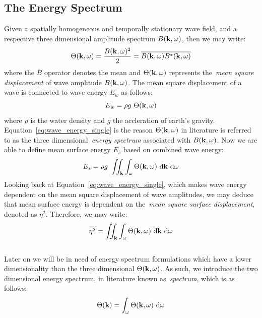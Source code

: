 \subsection{The Energy Spectrum}
\label{sec:energy_spectrum}
Given a spatially homogeneous and temporally stationary wave field, and a
respective three dimensional amplitude spectrum $B(\mathbf{k},\omega)$, then we
may write:
\begin{equation}
\label{eq:energy_spectrum_3d}
 \Theta(\mathbf{k}, \omega) = \frac{B(\mathbf{k}, \omega)^2}{2} = 
\overline{B(\mathbf{k}, \omega)B^{*}(\mathbf{k}, \omega)}
\end{equation}
where the $\overline{B}$ operator denotes the mean and
$\Theta(\mathbf{k},\omega)$ represents the~\emph{mean square displacement} of
wave amplitude $B(\mathbf{k},\omega)$. The mean square displacement of a wave
is connected to wave energy $E_w$ as follows:
%
\begin{equation}
\label{eq:wave_energy_single}
 E_w = \rho g~\Theta(\mathbf{k},\omega)
\end{equation}
%
where $\rho$ is the water density and $g$ the accleration of earth's gravity.
Equation~\ref{eq:wave_energy_single} is the reason $\Theta(\mathbf{k},\omega)$
in literature is referred to as the three dimensional~\emph{energy spectrum}
associated with $B(\mathbf{k},\omega)$. Now we are able to define mean surface
energy $E_s$ based on combined wave energy:
%
\begin{equation}
\label{eq:wave_energy_3d}
 E_s = \rho g~\iint_{\mathbf{k}}\int_{\omega}\Theta(\mathbf{k},\omega)
~\mathrm{d}\mathbf{k}~\mathrm{ d}\omega
\end{equation}
%
Looking back at Equation~\ref{eq:wave_energy_single}, which makes wave energy
dependent on the mean square displacement of wave amplitudes, we may deduce that
mean surface energy is dependent on the~\emph{mean square surface displacement},
denoted as $\overline{\eta^2}$. Therefore, we may write:
%
\begin{equation}
\label{eq:mean_square_eta}
\overline{\eta^2} = \iint_{\mathbf{k}}\int_{\omega}\Theta(\mathbf{k},\omega)
~\mathrm{d}\mathbf{k}~\mathrm{d}\omega
\end{equation}
%
\\
Later on we will be in need of energy spectrum formulations which have a lower
dimensionality than the three dimensional $\Theta(\mathbf{k},\omega)$. As such,
we introduce the two dimensional energy spectrum, in literature known
as~\emph{\wavenumber spectrum}, which is as follows:
\begin{equation}
\label{eq:energy_spectrum_2d}
 \Theta(\mathbf{k}) = \int_{\omega} \Theta(\mathbf{k}, \omega)~\mathrm{d}\omega
\end{equation}
